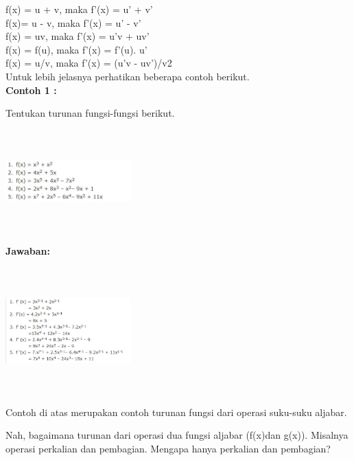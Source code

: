 \documentclass[11pt,fleqn]{book} %
\begin{document}
\noindent
f(x) = u + v,   maka f'(x) = u' + v'\\ 

\noindent 
f(x)= u - v,  maka f'(x) = u' - v'\\

\noindent 
f(x) = uv, maka f'(x) = u'v + uv'\\

\noindent 
f(x) = f(u), maka f'(x) = f'(u). u'\\

\noindent 
f(x) = u/v, maka f'(x) = (u'v - uv')/v2\\

\noindent 
Untuk lebih jelasnya perhatikan beberapa contoh berikut.\\

\noindent
\textbf{Contoh 1 :}

\noindent
Tentukan turunan fungsi-fungsi berikut.
\noindent

\noindent 
\begin{center}
\includegraphics*[width=1.90in, height=1.55in]{Pictures/TurunanFungsi13.JPG}
\end{center}

\noindent
\textbf{Jawaban:}

\noindent 
\begin{center}
\includegraphics*[width=1.90in, height=1.90in]{Pictures/TurunanFungsi14.JPG}
\end{center}

\noindent 
Contoh di atas merupakan contoh turunan fungsi dari operasi suku-suku aljabar.

\noindent 
Nah, bagaimana turunan dari operasi dua fungsi aljabar (f(x)dan g(x)). Misalnya operasi perkalian dan pembagian. Mengapa hanya perkalian dan pembagian?
\end{document}
